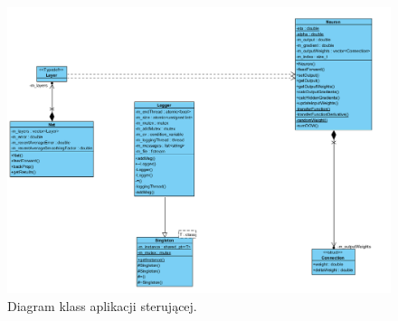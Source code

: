 \begin{figure}
\centering
\includegraphics[width=0.7\linewidth]{./include/diagram}
\caption{Diagram klass aplikacji sterującej.}
\label{fig:diagram}
\end{figure}
